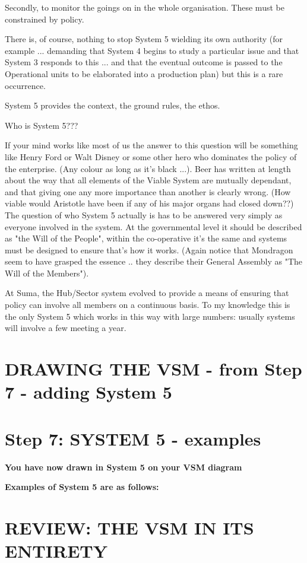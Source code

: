 Secondly, to monitor the goings on in the whole organisation. These must be constrained by policy.

There is, of course, nothing to stop System 5 wielding its own authority (for example ... demanding that System 4 begins to study a particular issue and that System 3 responds to this ... and that the eventual outcome is passed to the Operational units to be elaborated into a production plan) but this is a rare occurrence.

System 5 provides the context, the ground rules, the ethos.

Who is System 5???

If your mind works like most of us the answer to this question will be something like Henry Ford or Walt Disney or some other hero who dominates the policy of the enterprise. (Any colour as long as it's black ...). Beer has written at length about the way that all elements of the Viable System are mutually dependant, and that giving one any more importance than another is clearly wrong. (How viable would Aristotle have been if any of his major organs had closed down??) The question of who System 5 actually is has to be answered very simply as everyone involved in the system. At the governmental level it should be described as "the Will of the People", within the co-operative it's the same and systems must be designed to ensure that's how it works. (Again notice that Mondragon seem to have grasped the essence .. they describe their General Assembly as "The Will of the Members").

At Suma, the Hub/Sector system evolved to provide a means of ensuring that policy can involve all members on a continuous basis. To my knowledge this is the only System 5 which works in this way with large numbers: usually systems will involve a few meeting a year.

\section*{DRAWING THE VSM - from Step 7 - adding System 5}

\section*{Step 7: SYSTEM 5 - examples}
\textbf{You have now drawn in System 5 on your VSM diagram}

\textbf{Examples of System 5 are as follows:}


\section*{REVIEW: THE VSM IN ITS ENTIRETY}

